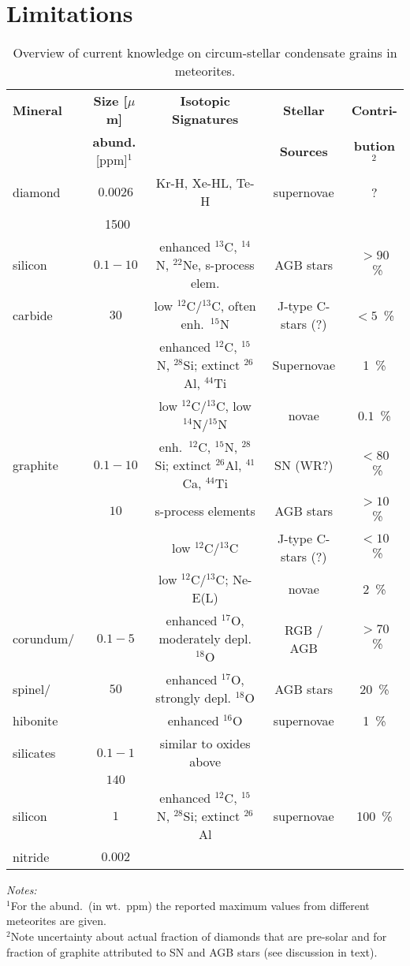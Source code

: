 \documentclass{iau_FM}
\begin{document}
\section{Limitations}
\begin{table}
  \begin{center}
  \caption{Overview of current knowledge on circum-stellar condensate grains in meteorites.}
  \label{tab1}
 {\scriptsize
  \begin{tabular}{|l|c|c|c|c|}\hline 
{\bf Mineral} & {\bf Size [$\mu$m]} & {\bf Isotopic Signatures} & {\bf Stellar} & {\bf Contri-} \\ 
   &  {\bf abund.}  [ppm]$^1$ & & {\bf Sources} & {\bf bution$^2$} \\ \hline
diamond & $~0.0026$ & Kr-H, Xe-HL, Te-H & supernovae & ? \\
   & ~1500 & & & \\ \hline
silicon & $~0.1-10$ & enhanced $^{13}$C, $^{14}$N, $^{22}$Ne, s-process elem. & AGB stars & $> 90$~\% \\
carbide & $~30$ & low $^{12}$C/$^{13}$C, often enh.\ $^{15}$N & J-type C-stars (?) & $< 5$~\% \\
 & & enhanced $^{12}$C, $^{15}$N, $^{28}$Si; extinct $^{26}$Al, $^{44}$Ti & Supernovae & 1~\% \\
 & & low $^{12}$C/$^{13}$C, low $^{14}$N/$^{15}$N & novae &  $0.1$~\% \\ \hline
graphite & $~0.1-10$ & enh.\ $^{12}$C, $^{15}$N, $^{28}$Si; extinct $^{26}$Al, $^{41}$Ca, $^{44}$Ti &
 SN (WR?) & $< 80$~\% \\ 
 & $~10$ & s-process elements & AGB stars & $> 10$~\% \\
 & & low $^{12}$C/$^{13}$C  & J-type C-stars (?) & $< 10$~\% \\
 & & low $^{12}$C/$^{13}$C; Ne-E(L) & novae & 2~\% \\ \hline
 corundum/ & $~0.1-5$ & enhanced $^{17}$O, moderately depl. $^{18}$O & RGB / AGB & $> 70$~\% \\
 spinel/ & $~50$ & enhanced $^{17}$O, strongly depl. $^{18}$O & AGB stars & 20~\% \\
 hibonite & & enhanced $^{16}$O & supernovae & 1~\% \\ \hline
 silicates & $~0.1-1$ & similar to oxides above & & \\
 &  $~140$ & & & \\ \hline
 silicon & $~1$ & enhanced $^{12}$C, $^{15}$N, $^{28}$Si; extinct $^{26}$Al & supernovae & 100~\% \\
 nitride & $~ 0.002$ & & & \\ \hline
  \end{tabular}
  }
 \end{center}
\vspace{1mm}
 \scriptsize{
 {\it Notes:}\\
  $^1$For the abund.\ (in wt.\ ppm) the reported maximum values from different meteorites are given. \\
  $^2$Note uncertainty about actual fraction of diamonds that are pre-solar and for fraction of graphite attributed to SN and AGB stars (see discussion in text).}
\end{table}
\end{document}
